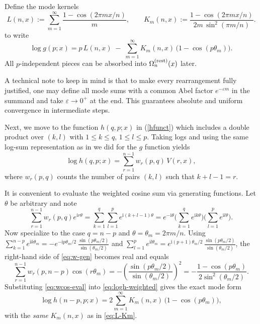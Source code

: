 \documentclass[11pt]{article}
\newcommand{\ii}{\mathrm{i}}
\newcommand{\eps}{\varepsilon}
\begin{document}
{  Define the mode kernels
  \begin{equation}
    L(n,x):=\sum_{m=1}^{\infty}\frac{1-\cos(2\pi m x/n)}{m}, \qquad K_{m}(n,x):=
    \frac{1-\cos(2\pi m x/n)}{2m\,\sin^{2}(\pi m/n)}. \label{eq:L-Km}
  \end{equation}
  to write
  \begin{equation}
    \log g(p;x)= p\,L(n,x)\;-\;\sum_{m=1}^{\infty}K_{m}(n,x)\,\bigl(1-\cos(p\theta
    _{m})\bigr). \label{eq:logg-final}
  \end{equation}
  All $p$-independent pieces can be absorbed into $\Omega_{n}^{\rm (rest)}(x)$
  later.

  A technical note to keep in mind is that to make every rearrangement fully
  justified, one may define all mode sums with a common Abel factor $e^{-\eps m}$
  in the summand and take $\eps\to 0^{+}$ at the end. This guarantees absolute
  and uniform convergence in intermediate steps.

  Next, we move to the function $h(q,p;x)$ in (\ref{hfunct}) which includes a double
  product over $(k,l)$ with $1\le k\le q$, $1\le l\le p$. Taking logs and using the
  same log-sum representation as in we did for the $g$ function yields
  \begin{equation}
    \log h(q,p;x)=\sum_{r=1}^{n-1}w_{r}(p,q)\,V(r,x), \label{eq:logh-weighted}
  \end{equation}
  where $w_{r}(p,q)$ counts the number of pairs $(k,l)$ such that $k+l-1=r$.

  It is convenient to evaluate the weighted cosine sum via generating functions.
  Let $\theta$ be arbitrary and note
  \begin{equation}
    \sum_{r=1}^{n-1}w_{r}(p,q)e^{\ii r\theta}=\sum_{k=1}^{q}\sum_{l=1}^{p}e^{\ii(k+l-1)\theta}
    =e^{-\ii\theta}\Big(\sum_{k=1}^{q}e^{\ii k\theta}\Big)\Big(\sum_{l=1}^{p}e^{\ii
    l\theta}\Big). \label{eq:w-gen}
  \end{equation}
  Now specialize to the case $q=n-p$ and $\theta=\theta_{m}=2\pi m/n$. Using $\sum
  _{k=1}^{n-p}e^{\ii k\theta_m}=-e^{-\ii p\theta_m/2}\,\frac{\sin(p\theta_{m}/2)}{\sin(\theta_{m}/2)}$
  and $\sum_{l=1}^{p}e^{\ii l\theta_m}=e^{\ii(p+1)\theta_m/2}\,\frac{\sin(p\theta_{m}/2)}{\sin(\theta_{m}/2)}$,
  the right-hand side of \eqref{eq:w-gen} becomes real and equals
  \begin{equation}
    \sum_{r=1}^{n-1}w_{r}(p,n-p)\cos(r\theta_{m}) = -\left(\frac{\sin(p\theta_{m}/2)}{\sin(\theta_{m}/2)}
    \right)^{2}= -\frac{1-\cos(p\theta_{m})}{2\sin^{2}(\theta_{m}/2)}. \label{eq:wcos-eval}
  \end{equation}
  Substituting \eqref{eq:wcos-eval} into \eqref{eq:logh-weighted} gives the exact
  mode form
  \begin{equation}
    \log h(n-p,p;x)= 2\sum_{m=1}^{\infty}K_{m}(n,x)\,\bigl(1-\cos(p\theta_{m})\bigr
    ), \label{eq:logh-final}
  \end{equation}
  with the \emph{same} $K_{m}(n,x)$ as in \eqref{eq:L-Km}.

}
\end{document}
